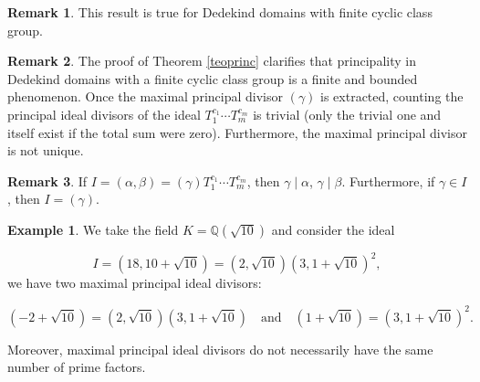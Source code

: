 \documentclass[11pt]{article}
\theoremstyle{definition}
\newtheorem{remark}{Remark}
\newtheorem{example}{Example}
\begin{document}
\begin{remark}
    This result is true for Dedekind domains with finite cyclic class group. 
\end{remark}

\begin{remark}
The proof of Theorem \ref{teoprinc} clarifies that principality in Dedekind domains with a finite cyclic class group is a finite and bounded phenomenon. Once the maximal principal divisor $(\gamma)$ is extracted, counting the principal ideal divisors of the ideal $T_1^{c_1} \cdots T_m^{c_m}$ is trivial (only the trivial one and itself exist if the total sum were zero). Furthermore, the maximal principal divisor is not unique.
\end{remark}

\begin{remark}
    If $I=(\alpha,\beta)=(\gamma)T_1^{c_1}\cdots T_m^{c_m}$, then $\gamma\mid \alpha$, $\gamma\mid \beta$. Furthermore, if $\gamma\in I$, then $I=(\gamma)$.
\end{remark}



\begin{example}
We take the field $K=\mathbb{Q}(\sqrt{10})$ and consider the ideal 

\[ I=(18,10+\sqrt{10})=(2,\sqrt{10})(3,1+\sqrt{10})^2, \]
we have two maximal principal ideal divisors: 

\[ (-2+\sqrt{10})=(2,\sqrt{10})(3,1+\sqrt{10}) \quad \text{and} \quad (1+\sqrt{10})=(3,1+\sqrt{10})^2. \]    
\end{example}
\noindent Moreover, maximal principal ideal divisors do not necessarily have the same number of prime factors.
\end{document}
